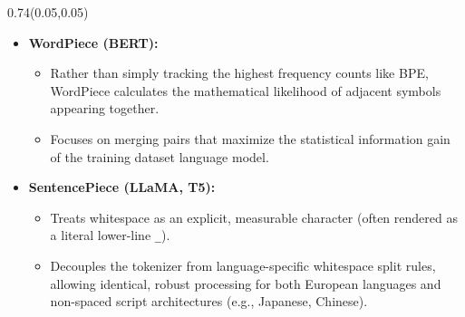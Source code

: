 \documentclass[aspectratio=169]{beamer}
\begin{document}
	\begin{frame}{}
		\setlength{\TPHorizModule}{\textwidth}
		\setlength{\TPVertModule}{\textwidth}
		\begin{textblock}{0.74}(0.05,0.05)
			\bfseries\large{}
		\end{textblock}
		
		\vspace{1.5em}
		\begin{itemize}
			\item \textbf{WordPiece (BERT):}
			\begin{itemize}
				\item Rather than simply tracking the highest frequency counts like BPE, WordPiece calculates the mathematical likelihood of adjacent symbols appearing together.
				\item Focuses on merging pairs that maximize the statistical information gain of the training dataset language model.
			\end{itemize}
			\vspace{0.5em}
			\item \textbf{SentencePiece (LLaMA, T5):}
			\begin{itemize}
				\item Treats whitespace as an explicit, measurable character (often rendered as a literal lower-line \texttt{\_}).
				\item Decouples the tokenizer from language-specific whitespace split rules, allowing identical, robust processing for both European languages and non-spaced script architectures (e.g., Japanese, Chinese).
			\end{itemize}
		\end{itemize}
	\end{frame}
	
\end{document}
